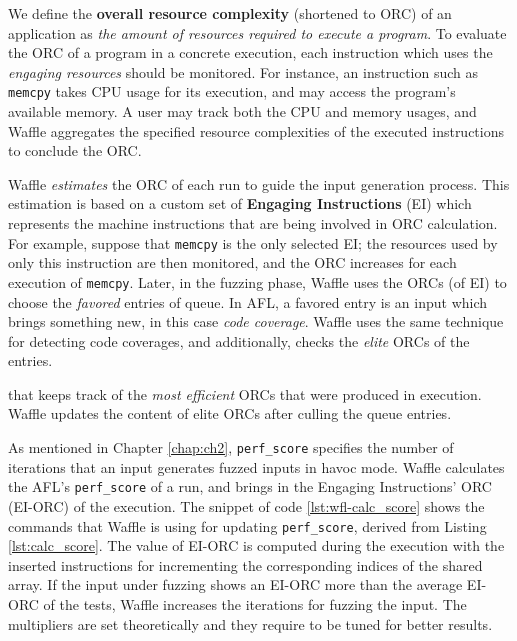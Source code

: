 We define the \textbf{overall resource complexity} (shortened to ORC) of an application as \textit{the amount of resources required to execute a program}. To evaluate the ORC of a program in a concrete execution, each instruction which uses the \textit{engaging resources} should be monitored. For instance, an instruction such as \texttt{memcpy} takes CPU usage for its execution, and may access the program's available memory. A user may track both the CPU and memory usages, and Waffle aggregates the specified resource complexities of the executed instructions to conclude the ORC.


Waffle \textit{estimates} the ORC of each run to guide the input generation process. This estimation is based on a custom set of \textbf{Engaging Instructions} (EI) which represents the machine instructions that are being involved in ORC calculation. For example, suppose that \texttt{memcpy} is the only selected EI; the resources used by only this instruction are then monitored, and the ORC increases for each execution of \texttt{memcpy}. Later, in the fuzzing phase, Waffle uses the ORCs (of EI) to choose the \textit{favored} entries of queue. In AFL, a favored entry is an input which brings something new, in this case \textit{code coverage}. Waffle uses the same technique for detecting code coverages, and additionally, checks the \textit{elite} ORCs of the entries. 



that keeps track of the \textit{most efficient} ORCs that were produced in execution. Waffle updates the content of elite ORCs after culling the queue entries. 

As mentioned in Chapter \ref{chap:ch2}, \texttt{perf\_score} specifies the number of iterations that an input generates fuzzed inputs in havoc mode. Waffle calculates the AFL's \texttt{perf\_score} of a run, and brings in the Engaging Instructions' ORC (EI-ORC) of the execution. The snippet of code \ref{lst:wfl-calc_score} shows the commands that Waffle is using for updating \texttt{perf\_score}, derived from Listing \ref{lst:calc_score}. The value of EI-ORC is computed during the execution with the inserted instructions for incrementing the corresponding indices of the shared array. If the input under fuzzing shows an EI-ORC more than the average EI-ORC of the tests, Waffle increases the iterations for fuzzing the input. The multipliers are set theoretically and they require to be tuned for better results.

